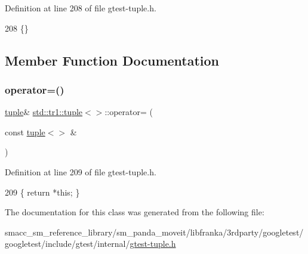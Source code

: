 Definition at line 208 of file gtest-\/tuple.\+h.


\begin{DoxyCode}
208 \{\}
\end{DoxyCode}


\subsection{Member Function Documentation}
\mbox{\label{classstd_1_1tr1_1_1tuple_3_4_a93ddab6f662662fc49635608619150c8}} 
\subsubsection{\texorpdfstring{operator=()}{operator=()}}
{\footnotesize\ttfamily \hyperlink{classstd_1_1tr1_1_1tuple}{tuple}\& \hyperlink{classstd_1_1tr1_1_1tuple}{std\+::tr1\+::tuple}$<$$>$\+::operator= (\begin{DoxyParamCaption}\item[{const \hyperlink{classstd_1_1tr1_1_1tuple}{tuple}$<$$>$ \&}]{ }\end{DoxyParamCaption})\hspace{0.3cm}{\ttfamily [inline]}}



Definition at line 209 of file gtest-\/tuple.\+h.


\begin{DoxyCode}
209 \{ \textcolor{keywordflow}{return} *\textcolor{keyword}{this}; \}
\end{DoxyCode}


The documentation for this class was generated from the following file\+:\begin{DoxyCompactItemize}
\item 
smacc\+\_\+sm\+\_\+reference\+\_\+library/sm\+\_\+panda\+\_\+moveit/libfranka/3rdparty/googletest/googletest/include/gtest/internal/\hyperlink{gtest-tuple_8h}{gtest-\/tuple.\+h}\end{DoxyCompactItemize}
